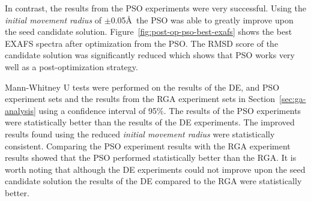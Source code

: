 In contrast, the results from the PSO experiments were very successful. Using the \textit{initial movement radius} of $\pm$0.05\AA\ the PSO was able to greatly improve upon the seed candidate solution. Figure~\ref{fig:post-op-pso-best-exafs} shows the best EXAFS spectra after optimization from the PSO. The RMSD score of the candidate solution was significantly reduced which shows that PSO works very well as a post-optimization strategy.

\begin{figure*}
	\centering
	\caption{OEC EXAFS Spectra Comparison}
	\label{fig:post-op-pso-best-exafs}
\end{figure*}

Mann-Whitney U tests were performed on the results of the DE, and PSO experiment sets and the results from the RGA experiment sets in Section~\ref{sec:ga-analysis} using a confidence interval of 95\%. The results of the PSO experiments were statistically better than the results of the DE experiments. The improved results found using the reduced \textit{initial movement radius} were statistically consistent. Comparing the PSO experiment results with the RGA experiment results showed that the PSO performed statistically better than the RGA. It is worth noting that although the DE experiments could not improve upon the seed candidate solution the results of the DE compared to the RGA were statistically better.